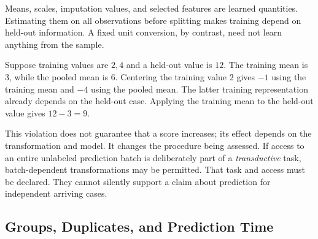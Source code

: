 Means, scales, imputation values, and selected features are learned quantities. Estimating them on all observations before splitting makes training depend on held-out information. A fixed unit conversion, by contrast, need not learn anything from the sample.

Suppose training values are $2,4$ and a held-out value is $12$. The training mean is $3$, while the pooled mean is $6$. Centering the training value $2$ gives $-1$ using the training mean and $-4$ using the pooled mean. The latter training representation already depends on the held-out case. Applying the training mean to the held-out value gives $12-3=9$.

\par\addvspace{\intextsep}\noindent\begin{minipage}{\linewidth}
\centering
{}
\label{fig:leakage-pipelines}
\end{minipage}\par\addvspace{\intextsep}

This violation does not guarantee that a score increases; its effect depends on the transformation and model. It changes the procedure being assessed. If access to an entire unlabeled prediction batch is deliberately part of a \emph{transductive} task, batch-dependent transformations may be permitted. That task and access must be declared. They cannot silently support a claim about prediction for independent arriving cases.

\subsection{Groups, Duplicates, and Prediction Time}

